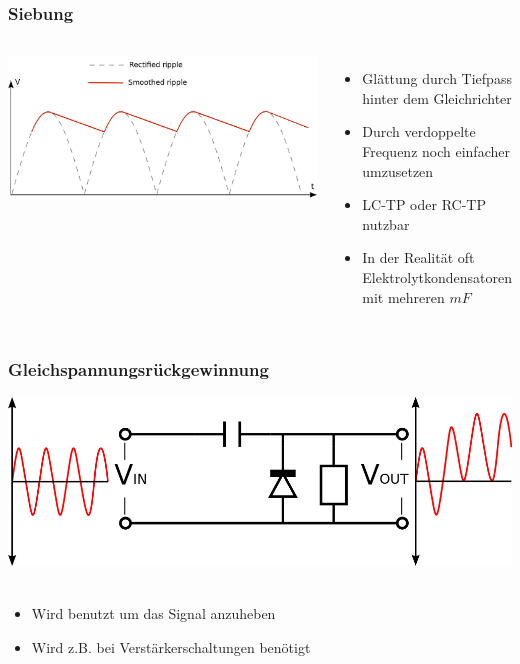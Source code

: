 \begin{frame}
    \frametitle{Siebung}
    \begin{columns}[c]
        \column[c]{5cm}
        \begin{center}
            \includegraphics[width=1\textwidth]{a05/Smoothed_ripple.png}\\
            \tiny \hyperlink{refs}{\cite{wm}}
        \end{center}
        \column{5cm}
    \begin{itemize}
			\item Glättung durch Tiefpass hinter dem Gleichrichter
			\item Durch verdoppelte Frequenz noch einfacher umzusetzen
			\item LC-TP oder RC-TP nutzbar
			\item In der Realität oft Elektrolytkondensatoren mit mehreren $mF$
    \end{itemize}
    \end{columns}
\end{frame}

\begin{frame}
    \frametitle{Gleichspannungsrückgewinnung}
    \begin{center}
    	\includegraphics[width=1\textwidth]{a05/Positive_Voltage_Clamping_Circuit.png}\\
        \tiny \hyperlink{refs}{\cite{wm}} \\[1em] \large
        \begin{itemize}
			\item Wird benutzt um das Signal anzuheben
			\item Wird z.B. bei Verstärkerschaltungen benötigt
    	\end{itemize}
 	\end{center}
\end{frame}


